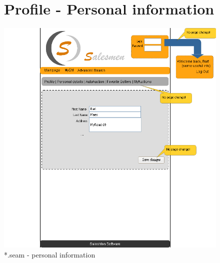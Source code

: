 \documentclass[salesmen, twoside]{../../../templates/latex/2009/softproj}
\begin{document}
\begin{projdoc}
\begin{figure}
\section{Profile - Personal information}
\label{fig_prototype_personal_info}
\includegraphics[width=15cm]{../../img/SM_mySM_personal.png}
\caption{*.seam - personal information}
\end{figure}
\begin{figure}

\end{figure}
\end{projdoc}
\end{document}
